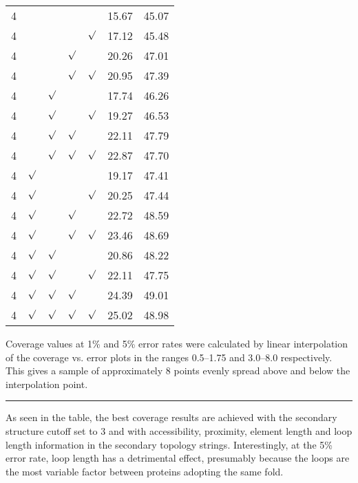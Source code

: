\documentclass{article}
\newcommand{\tick}{\mbox{$\surd$}}
\begin{document}
\begin{table}
\begin{tabularx}{\linewidth}{lllllXX}
4         &               &           &         &        & 15.67     & 45.07     \\
4         &               &           &         & \tick  & 17.12     & 45.48     \\
4         &               &           & \tick   &        & 20.26     & 47.01     \\
4         &               &           & \tick   & \tick  & 20.95     & 47.39     \\
4         &               & \tick     &         &        & 17.74     & 46.26     \\
4         &               & \tick     &         & \tick  & 19.27     & 46.53     \\
4         &               & \tick     & \tick   &        & 22.11     & 47.79     \\
4         &               & \tick     & \tick   & \tick  & 22.87     & 47.70     \\
4         & \tick         &           &         &        & 19.17     & 47.41     \\
4         & \tick         &           &         & \tick  & 20.25     & 47.44     \\
4         & \tick         &           & \tick   &        & 22.72     & 48.59     \\
4         & \tick         &           & \tick   & \tick  & 23.46     & 48.69     \\
4         & \tick         & \tick     &         &        & 20.86     & 48.22     \\
4         & \tick         & \tick     &         & \tick  & 22.11     & 47.75     \\
4         & \tick         & \tick     & \tick   &        & 24.39     & 49.01     \\
4         & \tick         & \tick     & \tick   & \tick  & 25.02     & 48.98     \\
\hline
\end{tabularx}
Coverage values at 1\% and 5\%
error rates were calculated by linear interpolation of the coverage
vs. error plots in the ranges 0.5--1.75 and 3.0--8.0
respectively. This gives a sample of approximately 8 points evenly
spread above and below the interpolation point.
\hrule
\end{table}

As seen in the table, the best coverage results are achieved with the
secondary structure cutoff set to 3 and with accessibility, proximity,
element length and loop length information in the secondary topology
strings.  Interestingly, at the 5\% error rate, loop length has a
detrimental effect, presumably because the loops are the most variable
factor between proteins adopting the same fold.
\end{document}
